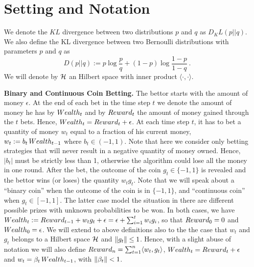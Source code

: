 \section{Setting and Notation}

We denote the $KL$ divergence between two distributions $p$ and $q$ as $D_KL(p||q)$.
We also define the KL divergence between two Bernoulli distributions with parameters $p$ and $q$ as
\[
D(p||q) := p \log\frac{p}{q} + (1-p) \log\frac{1-p}{1-q}~.
\]
We will denote by $\mathcal{H}$ an Hilbert space with inner product $\langle \cdot, \cdot\rangle$.

\vspace{0.2cm}\noindent\textbf{Binary and Continuous Coin Betting.}
The bettor starts with the amount of money $\epsilon$. 
At the end of each bet in the time step $t$ we denote the amount of money he has by $Wealth_t$ and by $Reward_t$ the amount of money gained through the $t$ bets. Hence, $Wealth_t=Reward_t+\epsilon$.
At each time step $t$, it has to bet a quantity of money $w_t$ equal to a fraction of his current money, $w_t:=b_t \, Wealth_{t-1}$ where $b_t \in (-1,1)$. Note that here we consider only betting strategies that will never result in a negative quantity of money owned. Hence, $|b_t|$ must be strictly less than 1, otherwise the algorithm could lose all the money in one round.
After the bet, the outcome of the coin $g_t \in \{-1,1\}$ is revealed and the bettor wins (or loses) the quantity $w_t g_t$.
Note that we will speak about a ``binary coin'' when the outcome of the coin is in $\{-1,1\}$, and ``continuous coin'' when $g_t \in [-1,1]$. The latter case model the situation in there are different possible prizes with unknown probabilities to be won. In both cases, we have $Wealth_t:=Reward_{t-1} + w_t g_t + \epsilon= \epsilon + \sum_{i=1}^t w_i g_i$, so that $Reward_0=0$ and $Wealth_0=\epsilon$.
We will extend to above definitions also to the the case that $w_t$ and $g_t$ belongs to a Hilbert space $\mathcal{H}$ and $\left\|{g_t}\right\|\leq 1$. Hence, with a slight abuse of notation we will also define $Reward_n=\sum_{t=1}^n \langle w_t, g_t \rangle$, $Wealth_t=Reward_t + \epsilon$ and $w_t = \beta_t \, Wealth_{t-1}$, with $\left\|{\beta_t}\right\| < 1$.

